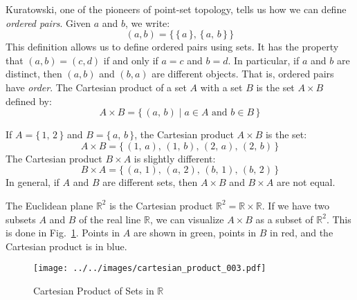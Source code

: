\documentclass{article}
\theoremstyle{plain}
\theoremstyle{normal}
\newenvironment{example}{%
    \pushQED{\qed}\renewcommand{\qedsymbol}{$\blacksquare$}\examplex%
}{%
    \popQED\endexamplex%
}
\newenvironment{definition}{%
    \pushQED{\qed}\renewcommand{\qedsymbol}{$\blacksquare$}\definitionx%
}{%
    \popQED\enddefinitionx%
}
\begin{document}
        Kuratowski, one of the pioneers of point-set topology, tells us how
        we can define \textit{ordered pairs}. Given $a$ and $b$, we write:
        \begin{equation}
            (a,b)=\big\{\,\{\,a\,\},\,\{\,a,\,b\,\}\,\big\}
        \end{equation}
        This definition allows us to define ordered pairs using sets. It has
        the property that $(a,b)=(c,d)$ if and only if $a=c$ and $b=d$. In
        particular, if $a$ and $b$ are distinct, then $(a,b)$ and $(b,a)$ are
        different objects. That is, ordered pairs have \textit{order}.
        \begin{definition}[\textbf{Cartesian Product}]
            The Cartesian product of a set $A$ with a set $B$ is the set
            $A\times{B}$ defined by:
            \begin{equation}
                A\times{B}=\{\,(a,\,b)\;|\;a\in{A}\textrm{ and }b\in{B}\,\}
            \end{equation}
        \end{definition}
        \begin{example}
            If $A=\{\,1,\,2\,\}$ and $B=\{\,a,\,b\,\}$, the Cartesian product
            $A\times{B}$ is the set:
            \begin{equation}
                A\times{B}=\{\,(1,\,a),\,(1,\,b),\,(2,\,a),\,(2,\,b)\,\}
            \end{equation}
            The Cartesian product $B\times{A}$ is slightly different:
            \begin{equation}
                B\times{A}=\{\,(a,\,1),\,(a,\,2),\,(b,\,1),\,(b,\,2)\,\}
            \end{equation}
            In general, if $A$ and $B$ are different sets, then $A\times{B}$
            and $B\times{A}$ are not equal.
        \end{example}
        \begin{example}
            The Euclidean plane $\mathbb{R}^{2}$ is the Cartesian product
            $\mathbb{R}^{2}=\mathbb{R}\times\mathbb{R}$.
        \end{example}
        If we have two subsets $A$ and $B$ of the real line $\mathbb{R}$, we
        can visualize $A\times{B}$ as a subset of $\mathbb{R}^{2}$.
        This is done in Fig.~\ref{fig:cartesian_product_003}. Points in $A$ are
        shown in green, points in $B$ in red, and the Cartesian product is in
        blue.
        \begin{figure}
            \centering
            \texttt{[image: ../../images/cartesian\_product\_003.pdf]}
            \caption{Cartesian Product of Sets in $\mathbb{R}$}
            \label{fig:cartesian_product_003}
        \end{figure}
\end{document}
